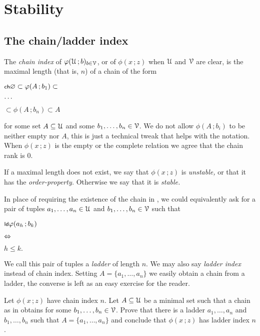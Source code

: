 \documentclass[scombinatorics.tex]{subfiles}
\begin{document}
\chapter{Stability}
\label{stability}



\def\medrel#1{\parbox[t]{5ex}{$\displaystyle\hfil #1$}}
\def\ceq#1#2#3{\parbox[t]{20ex}{$\displaystyle #1$}\medrel{#2}{$\displaystyle #3$}}


\section{The chain/ladder index}\label{ladder}

The \emph{chain index\/} of $\varphi(\EuScript U\,;b)_{b\in\EuScript V}$, or of $\phi(x\,;z)$ when $\EuScript U$ and $\EuScript V$ are clear, is the maximal length (that is, $n$) of a chain of the form

\ceq{\ssf{ch}\hfill\0\subset\phi(A\,;b_1)\subset}{\dots}{\subset\phi(A\,;b_n)\subset A}

for some set $A\subseteq\EuScript U$ and some $b_1,\dots,b_n\in\EuScript V$.
We do not allow $\phi(A\,;b_i)$ to be neither empty nor $A$, this is just a technical tweak that helps with the notation.
When $\phi(x\,;z)$ is the empty or the complete relation we agree that the chain rank is $0$. 

If a maximal length does not exist, we say that $\phi(x\,;z)$ is \emph{unstable,} or that it has the \emph{order-property.} 
Otherwise we say that it is \emph{stable.}

In place of requiring the existence of the chain in , we could equivalently ask for a pair of tuples $a_1,\dots,a_n\in\EuScript U$ and $b_1,\dots,b_n\in\EuScript V$ such that

\ceq{\ssf{ld}\hfill\phi(a_h\,;b_k)}
{\IFF}
{h\le k.}

We call this pair of tuples a \emph{ladder\/} of length $n$.
We may also say \emph{ladder index\/} instead of chain index.
Setting $A=\{a_1,\dots,a_n\}$ we easily obtain a chain from a ladder, the converse is left as an easy exercise for the reader.

\begin{exercise}
  Let $\phi(x\,;z)$ have chain index $n$. 
  Let $A\subseteq\EuScript U$ be a minimal set such that a chain as in  obtains for some $b_1,\dots,b_n\in\EuScript V$.
  Prove that there is a ladder $a_1,\dots,a_n$ and $b_1,\dots,b_n$ such that $A=\{a_1,\dots,a_n\}$ and conclude that $\phi(x\,;z)$ has ladder index $n$.\QED
\end{exercise}
\end{document}
